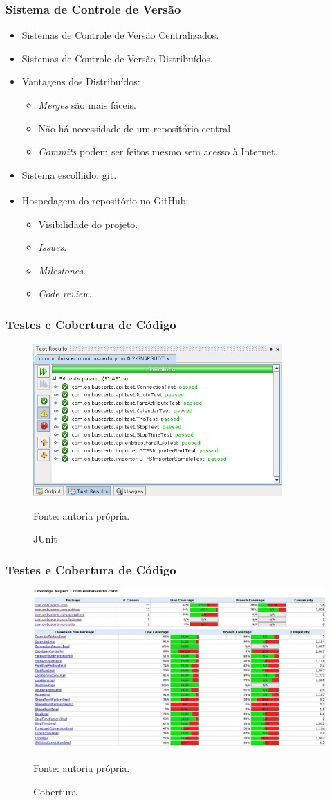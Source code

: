 \frame
{
\frametitle{Sistema de Controle de Versão}
	\begin{itemize}
		\item Sistemas de Controle de Versão Centralizados.
		\item Sistemas de Controle de Versão Distribuídos.
		\item Vantagens dos Distribuídos:
		\begin{itemize}
			\item \emph{Merges} são mais fáceis.
			\item Não há necessidade de um repositório central.
			\item \emph{Commits} podem ser feitos mesmo sem acesso à Internet.
		\end{itemize}
		\item Sistema escolhido: git.
		\item Hospedagem do repositório no GitHub{\textsuperscript\textregistered}:
		\begin{itemize}
			\item Visibilidade do projeto.
			\item \emph{Issues}.
			\item \emph{Milestones}.
			\item \emph{Code review}.
		\end{itemize}
	\end{itemize}
}

\frame
{
\frametitle{Testes e Cobertura de Código}
\begin{figure}
	\includegraphics[width=0.85\textwidth]{./imgs/testes.png}
	\caption{JUnit}
	\tiny
	Fonte: autoria própria.
\end{figure}
}

\frame
{
\frametitle{Testes e Cobertura de Código}
\begin{figure}
	\includegraphics[width=\textwidth]{./imgs/cobertura.png}
	\caption{Cobertura}
	\tiny
	Fonte: autoria própria.
\end{figure}
}
